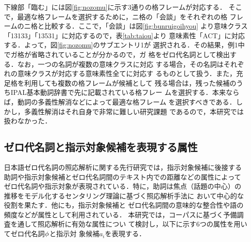 \noindent
下線部「臨む」には図\ref{fig:nozomu}に示す3通りの格フレームが対応する．
そこで，最適な格フレームを選択するために，ニ格の「会談」をそれぞれの格
フレームのニ格と比較する．ここで，「会談」は図\ref{fig:bunruigoihyou}
より意味クラス「13133」「13531」に対応するので，表\ref{tab:taiou}より
意味素性「ACT」に対応する．よって，図\ref{fig:nozomu}のサブエントリ1が
選択される．その結果，例1中でガ格が省略されていることが分かるので，ガ
格をゼロ代名詞として検出する．なお，一つの名詞が複数の意味クラスに対応
する場合，その名詞はそれぞれの意味クラスが対応する意味素性全てに対応す
るものとして扱う．また，充足格を利用しても複数の格フレームが候補として
残る場合は，残った候補のうちIPAL基本動詞辞書で先に記載されている格フレー
ムを選択する．本来ならば，動詞の多義性解消などによって最適な格フレーム
を選択すべきである．しかし，多義性解消はそれ自身で非常に難しい研究課題
であるので，本研究では扱わなかった．

\subsection{ゼロ代名詞と指示対象候補を表現する属性}
\label{sec:sosei}

日本語ゼロ代名詞の照応解析に関する先行研究では，指示対象候補に後接する
助詞や指示対象候補とゼロ代名詞間のテキスト内での距離などの属性によって
ゼロ代名詞や指示対象が表現されている．特に，助詞は焦点（話題の中心）の
推移をモデル化するセンタリング理論\cite{gros95}に基づく照応解析手法に
おいて中心的な役割を果たす\cite{kame86,walk94}．他にも，指示対象候補と
ゼロ代名詞間の意味的な整合性や語の頻度などが属性として利用されている．
本研究では，コーパスに基づく予備調査を通して照応解析に有効な属性につい
て検討し，以下に示す6つの属性を用いてゼロ代名詞${\it \phi}$と指示対
象候補$a_i$を表現する．

